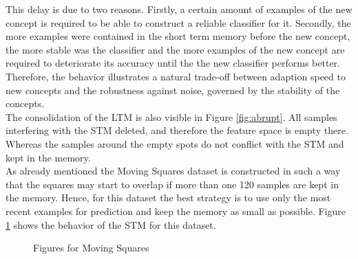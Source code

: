 \documentclass[conference]{IEEEtran}
\begin{document}
This delay is due to two reasons. Firstly, a certain amount of examples of the new concept is required to be able to construct a reliable classifier for it. Secondly,
the more examples were contained in the short term memory before the new concept, the more stable was the classifier and the more examples of the 
new concept are required to deteriorate its accuracy until the the new classifier performs better. Therefore, the behavior illustrates a natural trade-off between adaption speed
to new concepts and the robustness against noise, governed by the stability of the concepts.\\
The consolidation of the LTM is also visible in Figure \ref{fig:abrupt}. All samples interfering with the STM deleted, and therefore the feature space is empty there. 
Whereas the samples around the empty spots do not conflict with the STM and kept in the memory.\\
As already mentioned the Moving Squares dataset is constructed in such a way that the squares may start to overlap if more than one 120 samples are kept in the memory. Hence,
for this dataset the best strategy is to use only the most recent examples for prediction and keep the memory as small as possible. 
Figure \ref{fig:squares} shows the behavior of the STM for this dataset. 
\begin{figure}
\centering
	\vspace{0 pt}
\caption{Figures for Moving Squares}
\label{fig:squares}
\end{figure}
\end{document}
